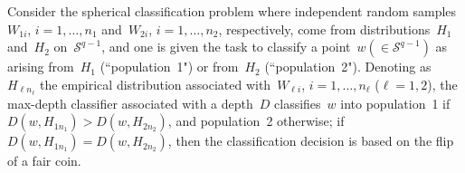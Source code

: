 \documentclass[usenames,dvipsnames]{article}
\begin{document}
Consider the spherical classification problem where independent random samples~$W_{1i}$, $i=1,\ldots,n_1$ and~$W_{2i}$, $i=1,\ldots,n_2$, respectively, come from distributions~$H_1$ and~$H_2$ on~$\mathcal{S}^{q-1}$, and one is given the task to classify a point~$w(\in\mathcal{S}^{q-1})$ as arising from~$H_1$ (``population~1") or from~$H_2$ (``population~2"). Denoting as~$H_{\ell n_\ell}$ the empirical distribution associated with~$W_{\ell i}$, $i=1,\ldots,n_\ell$ ($\ell=1,2$),
the max-depth classifier associated with a depth~$D$ classifies~$w$ into population~1 if~$D(w,H_{1n_1})>D(w,H_{2n_2})$, and population~2 otherwise; if~$D(w,H_{1n_1})=D(w,H_{2n_2})$, then the classification decision is based on the flip of a fair coin.    
\end{document}

